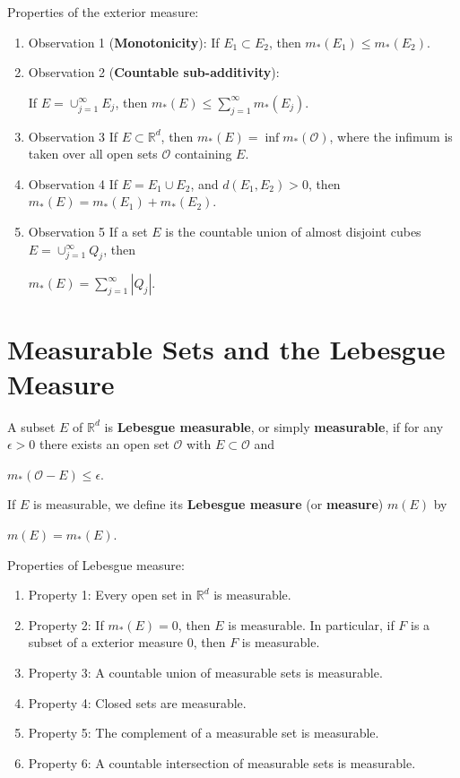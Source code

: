 \documentclass{book}
\newcommand{\RR}{\mathbb R}
\newcommand{\OO}{\mathcal{O}}
\begin{document}
Properties of the exterior measure:
\begin{enumerate}
    \item[]Observation 1 (\textbf{Monotonicity}):
    If $E_1\subset E_2$, then $m_*(E_1)\leq m_*(E_2)$.
    \item[]Observation 2 
    (\textbf{Countable sub-additivity}): 
    
    If $E=\cup_{j=1}^{\infty}E_j$, then $m_*(E)\leq\sum_{j=1}^{\infty}m_*(E_j)$.
    \item[]Observation 3
    If $E\subset\RR^d$, then $m_*(E)=\inf m_*(\OO)$, where the infimum is taken over all open sets $\OO$ containing $E$.
    \item[]Observation 4
    If $E=E_1\cup E_2$, and $d(E_1,E_2)>0$, then $m_*(E)=m_*(E_1)+m_*(E_2)$.
    \item[]Observation 5
    If a set $E$ is the countable union of almost disjoint cubes $E=\cup_{j=1}^\infty Q_j$, then
    \begin{center}
        $m_*(E)=\sum_{j=1}^\infty |Q_j|$.
    \end{center}
\end{enumerate}

\section{Measurable Sets and the Lebesgue Measure}
A subset $E$ of $\RR^d$ is \textbf{Lebesgue measurable}, or simply \textbf{measurable}, if for any $\epsilon>0$ there exists an open set $\OO$ with $E\subset\OO$ and 
\begin{center}
    $m_*(\OO-E)\leq\epsilon$.
\end{center}
If $E$ is measurable, we define its \textbf{Lebesgue measure} (or \textbf{measure}) $m(E)$ by 
\begin{center}
    $m(E)=m_*(E)$.
\end{center}

Properties of Lebesgue measure:
\begin{enumerate}
    \item[]
    Property 1:
    Every open set in $\RR^d$ is measurable.
    \item[]
    Property 2:
    If $m_*(E)=0$, then $E$ is measurable. In particular, if $F$ is a subset of a exterior measure $0$, then $F$ is measurable.
    \item[]
    Property 3:
    A countable union of measurable sets is measurable.
    \item[]
    Property 4:
    Closed sets are measurable.
    \item[]
    Property 5:
    The complement of a measurable set is measurable.
    \item[]
    Property 6:
    A countable intersection of measurable sets is measurable.
\end{enumerate}
\end{document}
